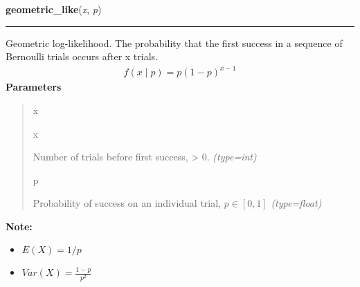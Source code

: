 \hspace{.8\funcindent}\begin{boxedminipage}{\funcwidth}

    \raggedright \textbf{geometric\_like}(\textit{x}, \textit{p})

    \vspace{-1.5ex}

    \rule{\textwidth}{0.5\fboxrule}
\setlength{\parskip}{2ex}

Geometric log-likelihood. The probability that the first success in a
sequence of Bernoulli trials occurs after x trials.
\begin{equation*}\begin{split}f(x \mid p) = p(1-p)^{x-1}\end{split}\end{equation*}\setlength{\parskip}{1ex}
      \textbf{Parameters}
      \vspace{-1ex}

      \begin{quote}
        \begin{Ventry}{x}

          \item[x]


Number of trials before first success, {\textgreater} 0.
            {\it (type=int)}

          \item[p]


Probability of success on an individual trial, $p \in [0,1]$
            {\it (type=float)}

        \end{Ventry}

      \end{quote}

\textbf{Note:} \begin{itemize}
\item {} 
$E(X)=1/p$

\item {} 
$Var(X)=\frac{1-p}{p^2}$

\end{itemize}


    \end{boxedminipage}

    \label{pymc:distributions:gev_like}

    \vspace{0.5ex}

